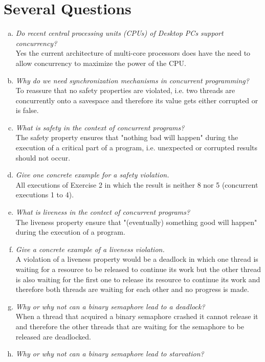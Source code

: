 \documentclass{report}
\begin{document}
	\hfill
	\section{Several Questions}
	\startsection
		\begin{enumerate}[a)]
			\item \textit{Do recent central processing units (CPUs) of Desktop PCs support concurrency?} \\
			Yes the current architecture of multi-core processors does have the need to allow concurrency to maximize the power of the CPU.
			\item \textit{Why do we need synchronization mechanisms in concurrent programming?} \\
			To reassure that no safety properties are violated, i.e. two threads are concurrently onto a savespace and therefore its value gets either corrupted or is false.
			\item \textit{What is safety in the context of concurrent programs?} \\
			The safety property ensures that "nothing bad will happen" during the execution of a critical part of a program, i.e. unexpected or corrupted results should not occur.
			\item \textit{Give one concrete example for a safety violation.} \\
			All executions of Exercise 2 in which the result is neither 8 nor 5 (concurrent executions 1 to 4).
			\item \textit{What is liveness in the contect of concurrent programs?} \\
			The liveness property ensure that "(eventually) something good will happen" during the execution of a program.
			\item \textit{Give a concrete example of a liveness violation.} \\
			A violation of a liveness property would be a deadlock in which one thread is waiting for a resource to be released to continue its work but the other thread is also waiting for the first one to release its resource to continue its work and therefore both threads are waiting for each other and no progress is made.
			\item \textit{Why or why not can a binary semaphore lead to a deadlock?} \\
			When a thread that acquired a binary semaphore crashed it cannot release it and therefore the other threads that are waiting for the semaphore to be released are deadlocked.
			\item \textit{Why or why not can a binary semaphore lead to starvation?} \\

\end{enumerate}
\end{document}
